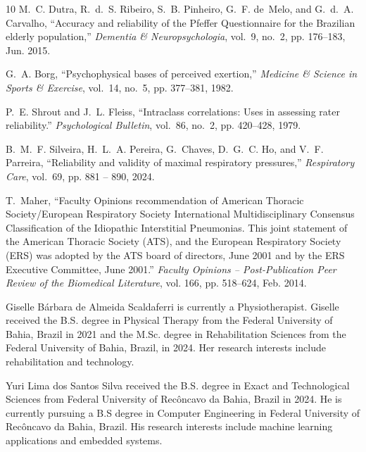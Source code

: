 \documentclass{ieeeaccess}
\begin{document}
{\begin{thebibliography}{10}
M.~C. Dutra, R.~d.~S. Ribeiro, S.~B. Pinheiro, G.~F. de~Melo, and G.~d.~A. Carvalho, ``Accuracy and reliability of the Pfeffer Questionnaire for the Brazilian elderly population,'' \emph{Dementia \& Neuropsychologia}, vol.~9, no.~2, pp. 176--183, Jun. 2015.

G.~A. Borg, ``Psychophysical bases of perceived exertion,'' \emph{Medicine \& Science in Sports \& Exercise}, vol.~14, no.~5, pp. 377--381, 1982.

P.~E. Shrout and J.~L. Fleiss, ``Intraclass correlations: {{Uses}} in assessing rater reliability.'' \emph{Psychological Bulletin}, vol.~86, no.~2, pp. 420--428, 1979.

B.~M.~F. Silveira, H.~L.~A. Pereira, G.~Chaves, D.~G.~C. Ho, and V.~F. Parreira, ``Reliability and validity of maximal respiratory pressures,'' \emph{Respiratory Care}, vol.~69, pp. 881 -- 890, 2024.

T.~Maher, ``Faculty {{Opinions}} recommendation of {{American Thoracic Society}}/{{European Respiratory Society International Multidisciplinary Consensus Classification}} of the {{Idiopathic Interstitial Pneumonias}}. {{This}} joint statement of the {{American Thoracic Society}} ({{ATS}}), and the {{European Respiratory Society}} ({{ERS}}) was adopted by the {{ATS}} board of directors, {{June}} 2001 and by the {{ERS Executive Committee}}, {{June}} 2001.'' \emph{Faculty Opinions -- Post-Publication Peer Review of the Biomedical Literature}, vol. 166, pp. 518--624, Feb. 2014.

\end{thebibliography}


\begin{IEEEbiographynophoto}{Giselle B\'arbara de Almeida Scaldaferri}
is currently a Physiotherapist. Giselle received the B.S. degree in Physical Therapy from the Federal University of Bahia, Brazil in 2021 and the M.Sc. degree in Rehabilitation Sciences from the Federal University of Bahia, Brazil, in 2024. Her research interests include rehabilitation and technology.
\end{IEEEbiographynophoto}

\begin{IEEEbiographynophoto}{Yuri Lima dos Santos Silva}
received the B.S. degree in Exact and Technological Sciences from Federal University of Recôncavo da Bahia, Brazil in 2024. He is currently pursuing a B.S degree in Computer Engineering in Federal University of Recôncavo da Bahia, Brazil. His research interests include machine learning applications and embedded systems.
\end{IEEEbiographynophoto}

}
\end{document}
